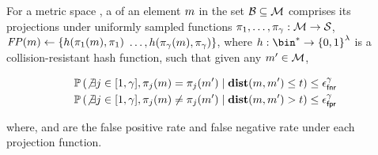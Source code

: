 \begin{definition}
	For a metric space \metricSpace, a \projectionPrimitive of an element $\genericMetricSpaceElmt$ in the set $\blocklist \subseteq \metricSpace$ 
	comprises its projections under uniformly sampled functions $\projFn[1], 
	\dots, \projFn[\numProjections]: \metricSpace \rightarrow \projectedSpace$, $\fingerprint(\genericMetricSpaceElmt) \assign 
	\{\hashFn(\projFn[1](\genericMetricSpaceElmt), \projFn[1])$ $\dots, \hashFn(\projFn[\numProjections](\genericMetricSpaceElmt), \projFn[\numProjections])\}$, where $\hashFn: \bin^{\ast} \rightarrow \setDefn{0,1}^{\secParam}$ is a collision-resistant hash function, such that given any 
$\genericMetricSpaceElmtAlt \in \metricSpace$,
		
		\begin{small}
		\begin{align}
			& \cprob{}{\not\exists \projIdx \in \nats[1][\numProjections], 
				\projFn[\projIdx](\genericMetricSpaceElmt) = \projFn[\projIdx](\genericMetricSpaceElmtAlt)}{\distanceNotation[\distance][\genericMetricSpaceElmt][\genericMetricSpaceElmtAlt] \le 
			\threshold} \le \fnr^{\numProjections} \label{eq:no_false_neg} \\
			& \cprob{}{\not\exists \projIdx \in \nats[1][\numProjections], 
				\projFn[\projIdx](\genericMetricSpaceElmt) \neq \projFn[\projIdx](\genericMetricSpaceElmtAlt)}{\distanceNotation[\distance][\genericMetricSpaceElmt][\genericMetricSpaceElmtAlt] > 
			\threshold} \le \fpr^{\numProjections} \label{eq:no_false_pos}
		\end{align}
		\end{small}
where,  \fpr and \fnr are the false positive rate and false negative rate under each projection function. 
		

		

\end{definition}

